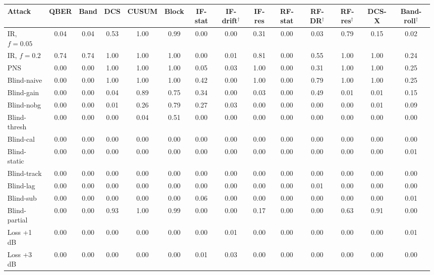 \begin{tabular}{lccccccccccccc}
\hline
Attack & QBER & Band & DCS & CUSUM & Block & IF-stat & IF-drift$^\dagger$ & IF-res & RF-stat & RF-DR$^\dagger$ & RF-res$^\dagger$ & DCS-X & Band-roll$^\dagger$\\
\hline
IR, $f=0.05$ & 0.04 & 0.04 & 0.53 & 1.00 & 0.99 & 0.00 & 0.00 & 0.31 & 0.00 & 0.03 & 0.79 & 0.15 & 0.02\\
IR, $f=0.2$ & 0.74 & 0.74 & 1.00 & 1.00 & 1.00 & 0.00 & 0.01 & 0.81 & 0.00 & 0.55 & 1.00 & 1.00 & 0.24\\
PNS & 0.00 & 0.00 & 1.00 & 1.00 & 1.00 & 0.05 & 0.03 & 1.00 & 0.00 & 0.31 & 1.00 & 1.00 & 0.25\\
Blind-naive & 0.00 & 0.00 & 1.00 & 1.00 & 1.00 & 0.42 & 0.00 & 1.00 & 0.00 & 0.79 & 1.00 & 1.00 & 0.25\\
Blind-gain & 0.00 & 0.00 & 0.04 & 0.89 & 0.75 & 0.34 & 0.00 & 0.03 & 0.00 & 0.49 & 0.01 & 0.01 & 0.15\\
Blind-nobg & 0.00 & 0.00 & 0.01 & 0.26 & 0.79 & 0.27 & 0.03 & 0.00 & 0.00 & 0.00 & 0.00 & 0.01 & 0.09\\
Blind-thresh & 0.00 & 0.00 & 0.00 & 0.04 & 0.51 & 0.00 & 0.00 & 0.00 & 0.00 & 0.00 & 0.00 & 0.00 & 0.00\\
Blind-cal & 0.00 & 0.00 & 0.00 & 0.00 & 0.00 & 0.00 & 0.00 & 0.00 & 0.00 & 0.00 & 0.00 & 0.00 & 0.00\\
Blind-static & 0.00 & 0.00 & 0.00 & 0.00 & 0.00 & 0.00 & 0.00 & 0.00 & 0.00 & 0.00 & 0.00 & 0.00 & 0.01\\
Blind-track & 0.00 & 0.00 & 0.00 & 0.00 & 0.00 & 0.00 & 0.00 & 0.00 & 0.00 & 0.00 & 0.00 & 0.00 & 0.00\\
Blind-lag & 0.00 & 0.00 & 0.00 & 0.00 & 0.00 & 0.00 & 0.00 & 0.00 & 0.00 & 0.01 & 0.00 & 0.00 & 0.00\\
Blind-sub & 0.00 & 0.00 & 0.00 & 0.00 & 0.00 & 0.06 & 0.00 & 0.00 & 0.00 & 0.00 & 0.00 & 0.00 & 0.01\\
Blind-partial & 0.00 & 0.00 & 0.93 & 1.00 & 0.99 & 0.00 & 0.00 & 0.17 & 0.00 & 0.00 & 0.63 & 0.91 & 0.00\\
Loss +1 dB & 0.00 & 0.00 & 0.00 & 0.00 & 0.00 & 0.00 & 0.01 & 0.00 & 0.00 & 0.00 & 0.00 & 0.00 & 0.01\\
Loss +3 dB & 0.00 & 0.00 & 0.00 & 0.00 & 0.00 & 0.01 & 0.03 & 0.00 & 0.00 & 0.00 & 0.00 & 0.00 & 0.00\\
\hline
\end{tabular}